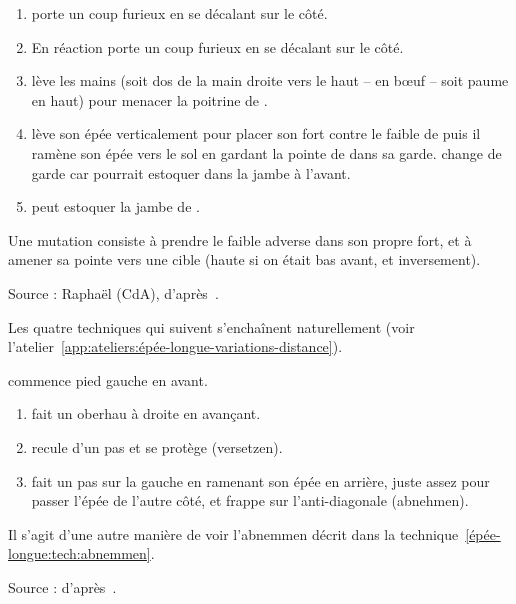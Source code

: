 \begin{technique}[Mutation]

\begin{enumerate}
	\item \A porte un coup furieux en se décalant sur le côté.
	
	\item En réaction \D porte un coup furieux en se décalant sur le côté.
	
	\item \D lève les mains (soit dos de la main droite vers le haut – en bœuf – soit paume en haut) pour menacer la poitrine de \A.
	
	\item \A lève son épée verticalement pour placer son fort contre le faible de \D puis il ramène son épée vers le sol en gardant la pointe de \D dans sa garde. \A change de garde car \D pourrait estoquer dans la jambe à l'avant.
	
	\item \A peut estoquer la jambe de \D.
\end{enumerate}

Une mutation consiste à prendre le faible adverse dans son propre fort, et à amener sa pointe vers une cible (haute si on était bas avant, et inversement).

Source : Raphaël (CdA), d'après~\cite[fol.~23v-24v, §3, p.~23]{farrell:ringeck}.
\end{technique}


Les quatre techniques qui suivent s'enchaînent naturellement (voir l'atelier~\ref{app:ateliers:épée-longue-variations-distance}).

\begin{technique}
\label{épée-longue:tech:dg-zufechten-abnemmen}

\A commence pied gauche en avant.

\begin{enumerate}
	\item \A fait un oberhau à droite en avançant.
	\item \D recule d'un pas et se protège (versetzen).
	\item \A fait un pas sur la gauche en ramenant son épée en arrière, juste assez pour passer l'épée de l'autre côté, et frappe sur l'anti-diagonale (abnehmen).
\end{enumerate}

Il s'agit d'une autre manière de voir l'abnemmen décrit dans la technique~\ref{épée-longue:tech:abnemmen}.

Source : d'après~\cite{kronenburg:dijon:going_distance:2015}.

\end{technique}


